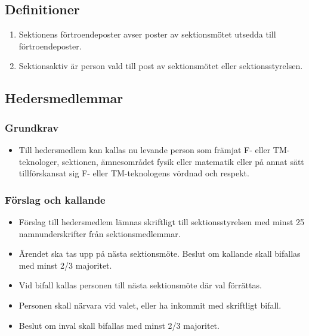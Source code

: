 \documentclass[11pt,a4paper]{article}
\begin{document}
\subsection{Definitioner}

\begin{enumerate}[\thesubsection .1]

\item Sektionens förtroendeposter avser poster av sektionsmötet utsedda till förtroendeposter.

\item Sektionsaktiv är person vald till post av sektionsmötet eller sektionsstyrelsen.
\end{enumerate}




\subsection{Hedersmedlemmar}

\subsubsection{Grundkrav}

\begin{itemize}

  \item Till hedersmedlem kan kallas nu levande person som främjat
  F- eller TM-tekno\-loger, sektionen, ämnesområdet fysik eller matematik eller på annat sätt till\-för\-skansat
  sig F- eller TM-tekno\-logens vördnad och respekt.

\end{itemize}

\subsubsection{Förslag och kallande}

\begin{itemize}

  \item Förslag till hedersmedlem lämnas skriftligt till sektionsstyrelsen med
  minst 25 namnunderskrifter från sektionsmedlemmar.

  \item Ärendet ska tas upp på nästa sektionsmöte. Beslut om kallande
  skall bifallas med minst 2/3 majoritet.

  \item Vid bifall kallas personen till nästa sektionsmöte där val
  förrättas.

  \item Personen skall närvara vid valet, eller ha inkommit med
  skriftligt bifall.

  \item Beslut om inval skall bifallas med minst 2/3 majoritet.

\end{itemize}
\end{document}
